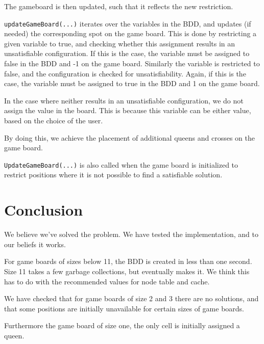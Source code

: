 \newpar The gameboard is then updated, such that it reflects the new restriction.

\newpar\texttt{updateGameBoard(...)} iterates over the variables in the BDD, and updates (if needed) the corresponding spot on the game board. This is done by restricting a given variable to true, and checking whether this assignment results in an unsatisfiable configuration. If this is the case, the variable must be assigned to false in the BDD and -1 on the game board. Similarly the variable is restricted to false, and the configuration is checked for unsatisfiability. Again, if this is the case, the variable must be assigned to true in the BDD and 1 on the game board.

\newpar In the case where neither results in an unsatisfiable configuration, we do not assign the value in the board. This is because this variable can be either value, based on the choice of the user.

\newpar By doing this, we achieve the placement of additional queens and crosses on the game board.

\newpar \texttt{UpdateGameBoard(...)} is also called when the game board is initialized to restrict positions where it is not possible to find a satisfiable solution.

\section{Conclusion}
We believe we've solved the problem. We have tested the implementation, and to our beliefs it works.

For game boards of sizes below 11, the BDD is created in less than one second. Size 11 takes a few garbage collections, but eventually makes it. We think this has to do with the recommended values for node table and cache.

\newpar We have checked that for game boards of size 2 and 3 there are no solutions, and that some positions are initially unavailable for certain sizes of game boards.

\newpar Furthermore the game board of size one, the only cell is initially assigned a queen.